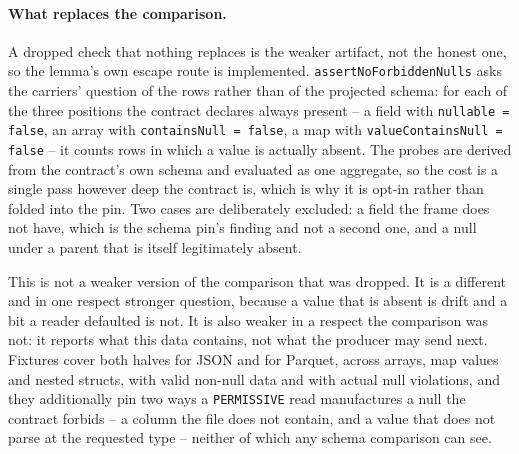 \paragraph{What replaces the comparison.}
\label{sec:values}
A dropped check that nothing replaces is the weaker artifact, not the honest one, so the lemma's own escape route is implemented. \texttt{assertNoForbiddenNulls} asks the carriers' question of the rows rather than of the projected schema: for each of the three positions the contract declares always present -- a field with \texttt{nullable = false}, an array with \texttt{containsNull = false}, a map with \texttt{valueContainsNull = false} -- it counts rows in which a value is actually absent. The probes are derived from the contract's own schema and evaluated as one aggregate, so the cost is a single pass however deep the contract is, which is why it is opt-in rather than folded into the pin. Two cases are deliberately excluded: a field the frame does not have, which is the schema pin's finding and not a second one, and a null under a parent that is itself legitimately absent.

This is not a weaker version of the comparison that was dropped. It is a different and in one respect stronger question, because a value that is absent is drift and a bit a reader defaulted is not. It is also weaker in a respect the comparison was not: it reports what this data contains, not what the producer may send next. Fixtures cover both halves for JSON and for Parquet, across arrays, map values and nested structs, with valid non-null data and with actual null violations, and they additionally pin two ways a \texttt{PERMISSIVE} read manufactures a null the contract forbids -- a column the file does not contain, and a value that does not parse at the requested type -- neither of which any schema comparison can see.

